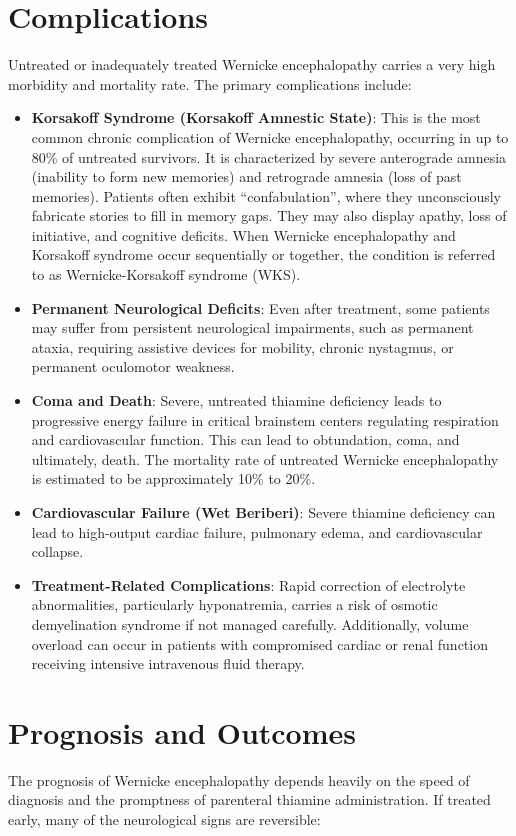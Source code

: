 \section*{Complications}
Untreated or inadequately treated Wernicke encephalopathy carries a very high morbidity and mortality rate. The primary complications include:

\begin{itemize}
    \item \textbf{Korsakoff Syndrome (Korsakoff Amnestic State)}: This is the most common chronic complication of Wernicke encephalopathy, occurring in up to 80\% of untreated survivors. It is characterized by severe anterograde amnesia (inability to form new memories) and retrograde amnesia (loss of past memories). Patients often exhibit ``confabulation'', where they unconsciously fabricate stories to fill in memory gaps. They may also display apathy, loss of initiative, and cognitive deficits. When Wernicke encephalopathy and Korsakoff syndrome occur sequentially or together, the condition is referred to as Wernicke-Korsakoff syndrome (WKS).
    \item \textbf{Permanent Neurological Deficits}: Even after treatment, some patients may suffer from persistent neurological impairments, such as permanent ataxia, requiring assistive devices for mobility, chronic nystagmus, or permanent oculomotor weakness.
    \item \textbf{Coma and Death}: Severe, untreated thiamine deficiency leads to progressive energy failure in critical brainstem centers regulating respiration and cardiovascular function. This can lead to obtundation, coma, and ultimately, death. The mortality rate of untreated Wernicke encephalopathy is estimated to be approximately 10\% to 20\%.
    \item \textbf{Cardiovascular Failure (Wet Beriberi)}: Severe thiamine deficiency can lead to high-output cardiac failure, pulmonary edema, and cardiovascular collapse.
    \item \textbf{Treatment-Related Complications}: Rapid correction of electrolyte abnormalities, particularly hyponatremia, carries a risk of osmotic demyelination syndrome if not managed carefully. Additionally, volume overload can occur in patients with compromised cardiac or renal function receiving intensive intravenous fluid therapy.
\end{itemize}

\section*{Prognosis and Outcomes}
The prognosis of Wernicke encephalopathy depends heavily on the speed of diagnosis and the promptness of parenteral thiamine administration. If treated early, many of the neurological signs are reversible:

